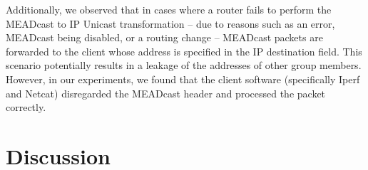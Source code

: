Additionally, we observed that in cases where a router fails to perform the
    MEADcast to IP Unicast transformation -- due to reasons such as an error,
    MEADcast being disabled, or a routing change -- MEADcast packets are
    forwarded to the client whose address is specified in the IP destination
    field.
This scenario potentially results in a leakage of the addresses of other
    group members.
However, in our experiments, we found that the client software (specifically
    Iperf and Netcat) disregarded the MEADcast header and processed the packet
    correctly.


\section{Discussion} %
\label{sec:Discussion}










